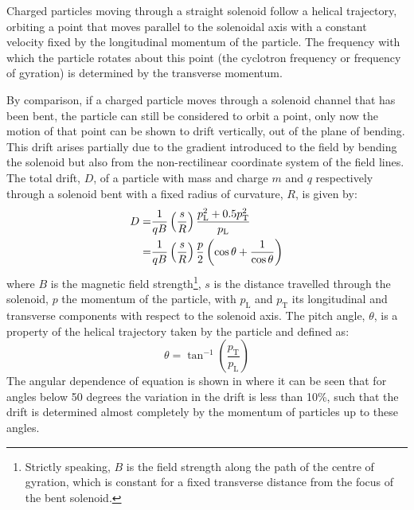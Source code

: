 Charged particles moving through a straight solenoid follow a helical
trajectory, orbiting a point that moves parallel to the solenoidal axis with a constant velocity fixed by the longitudinal momentum of the particle.
The frequency with which the particle rotates about this point (the cyclotron frequency or frequency of gyration) is determined by the transverse momentum.
\FigBentSolenoidRelativeDrift

By comparison, if a charged particle moves through a solenoid channel that has been bent, the particle can still be considered to orbit a point, only now 
the motion of that point can be shown to drift vertically, out of the plane of bending.
This drift arises partially due to the gradient introduced to the field by bending the solenoid but also from the 
non-rectilinear coordinate system of the field lines.  
The total drift, $D$, of a particle with mass and charge $m$ and $q$ respectively  through a solenoid bent with a fixed radius of curvature, $R$, is given by:
\begin{align}
	D=&\frac{1}{qB}\left(\frac{s}{R}\right)\frac{p^2_\mathrm{L}+0.5p^2_\mathrm{T}}{p_\mathrm{L}}\eqlabel{detector:bent-solenoids:longVstrans}\\
	 =&\frac{1}{qB}\left(\frac{s}{R}\right)\frac{p}{2}\left(\cos\theta + \frac{1}{\cos\theta}\right)\eqlabel{detector:bent-solenoids:pitchAngle}
\end{align}
where $B$ is the magnetic field strength\footnote{Strictly speaking, $B$ is the field strength along the path of the centre of gyration, which is constant for a fixed transverse distance from the focus of the bent solenoid.},
$s$ is the distance travelled through the solenoid, $p$ the momentum of the particle, with $p_\mathrm{L}$ and $p_\mathrm{T}$ its longitudinal and transverse components with respect to the solenoid axis.
The pitch angle, $\theta$, is a property of the helical trajectory taken by the particle and defined as:
\begin{equation}
\theta=\tan^{-1}\left(\frac{p_\mathrm{T}}{p_\mathrm{L}}\right)
\end{equation}
The angular dependence of equation  is shown in
 where it can be seen that for
angles below 50 degrees the variation in the drift is less than 10\%, such that
the drift is determined almost completely by the momentum of particles up to
these angles.

